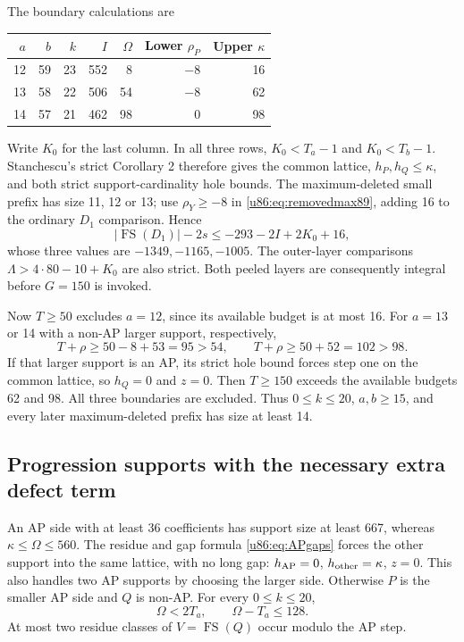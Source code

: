 \documentclass[11pt,a4paper]{article}
\theoremstyle{remark}
\newcommand{\FS}{\operatorname{FS}}
\begin{document}
The boundary calculations are
\begin{center}\small
\begin{tabular}{rrrrrrr}
\toprule
$a$&$b$&$k$&$I$&$\Omega$&Lower $\rho_P$&Upper $\kappa$\\\midrule
12&59&23&552&8&$-8$&16\\
13&58&22&506&54&$-8$&62\\
14&57&21&462&98&0&98\\\bottomrule
\end{tabular}
\end{center}
Write $K_0$ for the last column. In all three rows,
$K_0<T_a-1$ and $K_0<T_b-1$. Stanchescu's strict Corollary 2 therefore
gives the common lattice, $h_P,h_Q\le\kappa$, and both strict
support-cardinality hole bounds.
The maximum-deleted small prefix has size 11, 12 or 13; use
$\rho_Y\ge-8$ in \eqref{u86:eq:removedmax89}, adding 16 to the ordinary
$D_1$ comparison. Hence
\[
 |\FS(D_1)|-2s\le-293-2I+2K_0+16,
\]
whose three values are $-1349,-1165,-1005$.
The outer-layer comparisons $\Lambda>4\cdot80-10+K_0$ are also strict.
Both peeled layers are consequently integral before $G=150$ is invoked.

Now $T\ge50$ excludes $a=12$, since its available budget is at most 16.
For $a=13$ or 14 with a non-AP larger support, respectively,
\[
 T+\rho\ge50-8+53=95>54,
 \qquad T+\rho\ge50+52=102>98.
\]
If that larger support is an AP, its strict hole bound forces step one
on the common lattice, so $h_Q=0$ and $z=0$. Then $T\ge150$ exceeds
the available budgets 62 and 98. All three boundaries are excluded.
Thus $0\le k\le20$, $a,b\ge15$, and every later maximum-deleted prefix
has size at least 14.

\subsection{Progression supports with the necessary extra defect term}
An AP side with at least 36 coefficients has support size at least 667,
whereas $\kappa\le\Omega\le560$. The residue and gap formula
\eqref{u86:eq:APgaps} forces the other support into the same lattice, with
no long gap: $h_{\rm AP}=0$, $h_{\rm other}=\kappa$, $z=0$.
This also handles two AP supports by choosing the larger side.
Otherwise $P$ is the smaller AP side and $Q$ is non-AP.
For every $0\le k\le20$,
\begin{equation}\label{u86:eq:AP88range}
 \Omega<2T_a,\qquad\Omega-T_a\le128.
\end{equation}
At most two residue classes of $V=\FS(Q)$ occur modulo the AP step.
\end{document}
